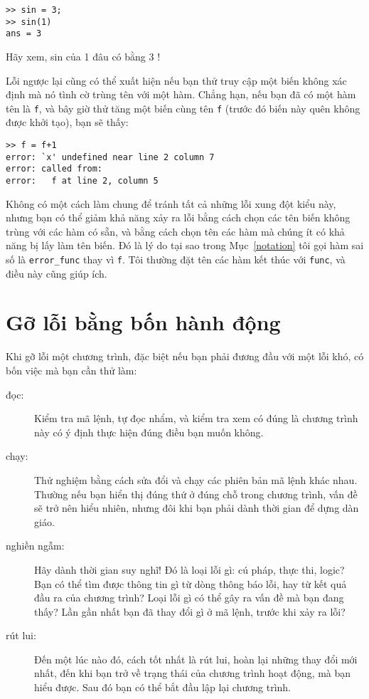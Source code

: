 \documentclass[12pt]{book}
\begin{document}
\begin{verbatim}
>> sin = 3;
>> sin(1)
ans = 3
\end{verbatim}
%
Hãy xem, sin của 1 đâu có bằng 3 !

Lỗi ngược lại cũng có thể xuất hiện nếu bạn thử truy cập một biến
không xác định mà nó tình cờ trùng tên với một hàm. Chẳng hạn, nếu
bạn đã có một hàm tên là {\tt f}, và bây giờ thử tăng một biến
cùng tên {\tt f} (trước đó biến này quên không được khởi tạo), bạn
sẽ thấy:

\begin{verbatim}
>> f = f+1
error: `x' undefined near line 2 column 7
error: called from:
error:   f at line 2, column 5
\end{verbatim}
%
Không có một cách làm chung để tránh tất cả những lỗi xung đột
kiểu này, nhưng bạn có thể giảm khả năng xảy ra lỗi bằng cách chọn
các tên biến không trùng với các hàm có sẵn, và bằng cách chọn tên
các hàm mà chúng ít có khả năng bị lấy làm tên biến. Đó là lý do
tại sao trong Mục~\ref{notation} tôi gọi hàm sai số là
\verb#error_func# thay vì {\tt f}.  Tôi thường đặt tên các hàm
kết thúc với {\tt func}, và điều này cũng giúp ích.


\section{Gỡ lỗi bằng bốn hành động}

Khi gỡ lỗi một chương trình, đặc biệt nếu bạn phải đương đầu với
một lỗi khó, có bốn việc mà bạn cần thử làm:

\begin{description}

\item[đọc:] Kiểm tra mã lệnh, tự đọc nhẩm, và kiểm tra xem có đúng
là chương trình này có ý định thực hiện đúng điều bạn muốn không.

\item[chạy:] Thử nghiệm bằng cách sửa đổi và chạy các phiên bản mã lệnh
khác nhau. Thường nếu bạn hiển thị đúng thứ ở đúng chỗ trong chương
trình, vấn đề sẽ trở nên hiểu nhiên, nhưng đôi khi bạn phải dành 
thời gian để dựng dàn giáo.

\item[nghiền ngẫm:] Hãy dành thời gian suy nghĩ! Đó là loại lỗi gì:
cú pháp, thực thi, logic? Bạn có thể tìm được thông tin gì từ dòng
thông báo lỗi, hay từ kết quả đầu ra của chương trình? Loại lỗi gì
có thể gây ra vấn đề mà bạn đang thấy? Lần gần nhất bạn đã thay đổi
gì ở mã lệnh, trước khi xảy ra lỗi?

\item[rút lui:] Đến một lúc nào đó, cách tốt nhất là rút lui, hoàn lại
những thay đổi mới nhất, đến khi bạn trở về trạng thái của chương
trình hoạt động, mà bạn hiểu được. Sau đó bạn có thể bắt đầu lập
lại chương trình.

\end{description}
\end{document}
